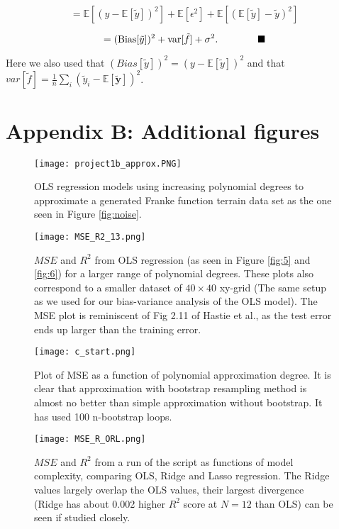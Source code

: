 \documentclass[reprint,english,notitlepage]{revtex4-1}  %
\newcommand*{\QEDA}{\hfill\ensuremath{\blacksquare}}
\begin{document}
$$ = \mathbb{E}[(y - \mathbb{E}[\tilde{y}])^2] + \mathbb{E}[\epsilon^2] + \mathbb{E}[(\mathbb{E}[\tilde{y}] - \tilde{y})^2]$$

$$=(\mathrm{Bias}[\tilde{y}])^2+\mathrm{var}[\tilde{f}]+\sigma^2. \quad \quad \quad \quad \QEDA$$

Here we also used that $(Bias[\tilde{y}])^2 = (y - \mathbb{E}[\tilde{y}])^2$ and that $var[\tilde{f}] = \frac{1}{n}\sum_i(\tilde{y}_i-\mathbb{E}\left[\bm{\tilde{y}}\right])^2$.

\section{Appendix B: Additional figures}

\onecolumngrid
\begin{figure}[h!]
    \centering
    \texttt{[image: project1b\_approx.PNG]}
    \caption{OLS regression models using increasing polynomial degrees to approximate a generated Franke function terrain data set as the one seen in Figure \ref{fig:noise}.}
    \label{fig:ols_approx}
\end{figure}

\begin{figure}[h!]
    \centering
    \texttt{[image: MSE\_R2\_13.png]}
    \caption{$MSE$ and $R^2$ from OLS regression (as seen in Figure \ref{fig:5} and \ref{fig:6}) for a larger range of polynomial degrees. These plots also correspond to a smaller dataset of $40 \times 40$ xy-grid (The same setup as we used for our bias-variance analysis of the OLS model). The MSE plot is reminiscent of Fig 2.11 of Hastie et al., as the test error ends up larger than the training error.}
    \label{fig:OLS_ext}
\end{figure}

\begin{figure}[h!]
    \centering
    \texttt{[image: c\_start.png]}
    \caption{Plot of MSE as a function of polynomial approximation degree. It is clear that approximation with bootstrap resampling method is almost no better than simple approximation without bootstrap. It has used 100 n-bootstrap loops. }
    \label{fig:fig5_modded}
\end{figure}
\twocolumngrid

\begin{figure}[h!]
    \centering
    \texttt{[image: MSE\_R\_ORL.png]}
    \caption{$MSE$ and $R^2$ from a run of the script as functions of model complexity, comparing OLS, Ridge and Lasso regression. The Ridge values largely overlap the OLS values, their largest divergence (Ridge has about 0.002 higher $R^2$ score at $N = 12$ than OLS) can be seen if studied closely.}
    \label{fig:terrain_misc}
\end{figure}
\end{document}
